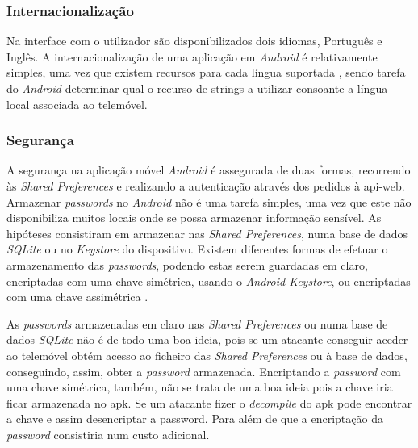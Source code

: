 \subsubsection{Internacionalização}

Na interface com o utilizador são disponibilizados dois idiomas, Português e Inglês. A internacionalização de uma aplicação em \textit{Android} é relativamente simples, uma vez que existem recursos para cada língua suportada \cite{Supportd:android}, sendo tarefa do \textit{Android} determinar qual o recurso de strings a utilizar consoante a língua local associada ao telemóvel.


\subsubsection{Segurança}

A segurança na aplicação móvel \textit{Android} é assegurada de duas formas, recorrendo às \textit{Shared Preferences} e realizando a autenticação através dos pedidos à \gls{api-web}. 
Armazenar \textit{passwords} no \textit{Android} não é uma tarefa simples, uma vez que este não disponibiliza muitos locais onde se possa armazenar informação sensível. As hipóteses consistiram em armazenar nas \textit{Shared Preferences}, numa base de dados \textit{SQLite} ou no \textit{Keystore} do dispositivo. Existem diferentes formas de efetuar o armazenamento das \textit{passwords}, podendo estas serem guardadas em claro, encriptadas com uma chave simétrica, usando o \textit{Android Keystore}, ou encriptadas com uma chave assimétrica \cite{Bestplacetostorepassword:android}.

As \textit{passwords} armazenadas em claro nas \textit{Shared Preferences} ou numa base de dados \textit{SQLite} não é de todo uma boa ideia, pois se um atacante conseguir aceder ao telemóvel obtém acesso ao ficheiro das \textit{Shared Preferences} ou à base de dados, conseguindo, assim, obter a \textit{password} armazenada. Encriptando a \textit{password} com uma chave simétrica, também, não se trata de uma boa ideia pois a chave iria ficar armazenada no \acrfull{apk}. Se um atacante fizer o \textit{decompile} do \acrshort{apk} pode encontrar a chave e assim desencriptar a password. Para além de que a encriptação da \textit{password} consistiria num custo adicional. 

